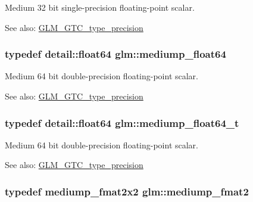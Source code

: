 Medium 32 bit single-precision floating-point scalar. \begin{Desc}
\item[See also:]\hyperlink{group__gtc__type__precision}{GLM\_\-GTC\_\-type\_\-precision} \end{Desc}
\hypertarget{group__gtc__type__precision_g9225ae6aed0f90b6eb65bf8d466199c1}{
\subsubsection[mediump\_\-float64]{\setlength{\rightskip}{0pt plus 5cm}typedef detail::float64 {\bf glm::mediump\_\-float64}}}
\label{group__gtc__type__precision_g9225ae6aed0f90b6eb65bf8d466199c1}


Medium 64 bit double-precision floating-point scalar. \begin{Desc}
\item[See also:]\hyperlink{group__gtc__type__precision}{GLM\_\-GTC\_\-type\_\-precision} \end{Desc}
\hypertarget{group__gtc__type__precision_g97a0747b103eb5ef320a91888de52f51}{
\subsubsection[mediump\_\-float64\_\-t]{\setlength{\rightskip}{0pt plus 5cm}typedef detail::float64 {\bf glm::mediump\_\-float64\_\-t}}}
\label{group__gtc__type__precision_g97a0747b103eb5ef320a91888de52f51}


Medium 64 bit double-precision floating-point scalar. \begin{Desc}
\item[See also:]\hyperlink{group__gtc__type__precision}{GLM\_\-GTC\_\-type\_\-precision} \end{Desc}
\hypertarget{group__gtc__type__precision_g5b9de77ef7403ffc972700219eca5450}{
\subsubsection[mediump\_\-fmat2]{\setlength{\rightskip}{0pt plus 5cm}typedef mediump\_\-fmat2x2 {\bf glm::mediump\_\-fmat2}}}
\label{group__gtc__type__precision_g5b9de77ef7403ffc972700219eca5450}


